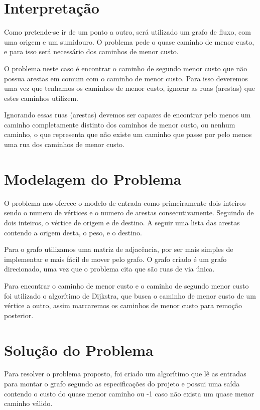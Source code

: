 \documentclass[12pt]{article}
\begin{document}
\section{Interpretação} 

Como pretende-se ir de um ponto a outro, será utilizado um grafo de fluxo, com uma origem e um sumidouro. O problema pede o quase caminho de menor custo, e para isso será necessário dos caminhos de menor custo.

O problema neste caso é encontrar o caminho de segundo menor custo que não possua  arestas em comum com o caminho de menor custo. Para isso deveremos uma vez que tenhamos os caminhos de menor custo, ignorar as ruas (arestas) que estes caminhos utilizem. 

Ignorando essas ruas (arestas) devemos ser capazes de encontrar pelo menos um caminho completamente distinto dos caminhos de menor custo, ou nenhum caminho, o que representa que não existe um caminho que passe por pelo menos uma rua dos caminhos de  menor custo.


\section{Modelagem do Problema}

O problema nos oferece o modelo de entrada como primeiramente dois inteiros sendo o numero de vértices e o numero de arestas consecutivamente. Seguindo de dois inteiros, o vértice de origem e de destino. A seguir uma lista das arestas contendo a origem desta, o peso, e o destino.

Para o grafo utilizamos uma matriz de adjacência, por ser mais simples de implementar e mais fácil de mover pelo grafo. O grafo criado é um grafo direcionado, uma vez que o problema cita que são ruas de via única.

Para encontrar o caminho de menor custo e o caminho de segundo menor custo foi utilizado o algorítimo de Dijkstra, que busca o caminho de menor custo de um vértice a outro, assim marcaremos os caminhos de menor custo para remoção posterior.


\section{Solução do Problema}

Para resolver o problema proposto, foi criado um algorítimo que lê as entradas para montar o grafo segundo as especificações do projeto e possui uma saída contendo o custo do quase menor caminho ou -1 caso não exista um quase menor caminho válido.
 
\end{document}
